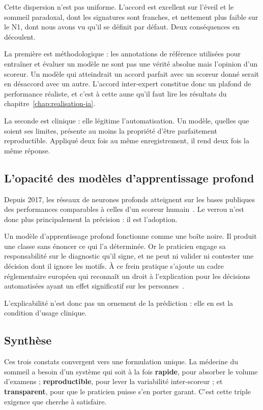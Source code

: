 Cette dispersion n'est pas uniforme. L'accord est excellent sur l'éveil et le sommeil
paradoxal, dont les signatures sont franches, et nettement plus faible sur le N1,
dont nous avons vu qu'il se définit par défaut. Deux conséquences en découlent.

La première est méthodologique : les annotations de référence utilisées pour entraîner
et évaluer un modèle ne sont pas une vérité absolue mais l'opinion d'un scoreur. Un
modèle qui atteindrait un accord parfait avec un scoreur donné serait en désaccord
avec un autre. L'accord inter-expert constitue donc un plafond de performance
réaliste, et c'est à cette aune qu'il faut lire les résultats du
chapitre~\ref{chap:realisation-ia}.

La seconde est clinique : elle légitime l'automatisation. Un modèle, quelles que
soient ses limites, présente au moins la propriété d'être parfaitement reproductible.
Appliqué deux fois au même enregistrement, il rend deux fois la même réponse.

\subsection{L'opacité des modèles d'apprentissage profond}

Depuis 2017, les réseaux de neurones profonds atteignent sur les bases publiques des
performances comparables à celles d'un scoreur humain~\cite{supratak2017,perslev2021}.
Le verrou n'est donc plus principalement la précision : il est l'adoption.

Un modèle d'apprentissage profond fonctionne comme une boîte noire. Il produit une
classe sans énoncer ce qui l'a déterminée. Or le praticien engage sa responsabilité
sur le diagnostic qu'il signe, et ne peut ni valider ni contester une décision dont
il ignore les motifs. À ce frein pratique s'ajoute un cadre réglementaire européen
qui reconnaît un droit à l'explication pour les décisions automatisées ayant un effet
significatif sur les personnes~\cite{goodman2017}.

L'explicabilité n'est donc pas un ornement de la prédiction : elle en est la
condition d'usage clinique.

\subsection{Synthèse}

Ces trois constats convergent vers une formulation unique. La médecine du sommeil a
besoin d'un système qui soit à la fois \textbf{rapide}, pour absorber le volume
d'examens ; \textbf{reproductible}, pour lever la variabilité inter-scoreur ; et
\textbf{transparent}, pour que le praticien puisse s'en porter garant. C'est cette
triple exigence que \hypnoria{} cherche à satisfaire.

